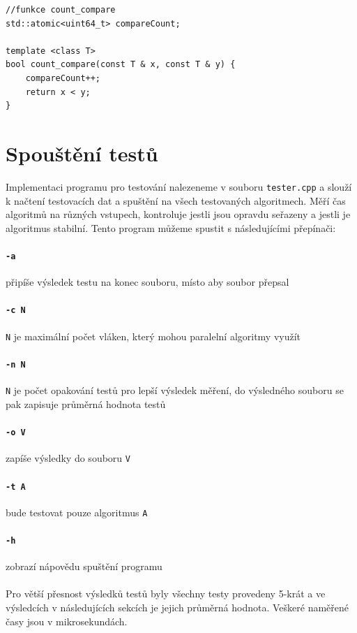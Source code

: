 \documentclass[thesis=B,czech]{FITthesis}[2019/12/23]
\begin{document}
\begin{verbatim}
//funkce count_compare
std::atomic<uint64_t> compareCount;

template <class T>
bool count_compare(const T & x, const T & y) {
    compareCount++;
    return x < y;
}
\end{verbatim}

\section{Spouštění testů}
Implementaci programu pro testování nalezeneme v souboru \texttt{tester.cpp} a slouží k načtení testovacích dat a spuštění na všech testovaných algoritmech. Měří čas algoritmů na různých vstupech, kontroluje jestli jsou opravdu seřazeny a jestli je algoritmus stabilní. 
Tento program můžeme spustit s následujícími přepínači:
\paragraph{\texttt{-a}}{připíše výsledek testu na konec souboru, místo aby soubor přepsal}
\paragraph{\texttt{-c N}}{\texttt{N} je maximální počet vláken, který mohou paralelní algoritmy využít}
\paragraph{\texttt{-n N}}{\texttt{N} je počet opakování testů pro lepší výsledek měření, do výsledného souboru se pak zapisuje průměrná hodnota testů}
\paragraph{\texttt{-o V}}{zapíše výsledky do souboru \texttt{V}}
\paragraph{\texttt{-t A}}{bude testovat pouze algoritmus \texttt{A}}
\paragraph{\texttt{-h}}{zobrazí nápovědu spuštění programu}
\\
\\
Pro větší přesnost výsledků testů byly všechny testy provedeny 5-krát a ve výsledcích v následujících sekcích je jejich průměrná hodnota. Veškeré naměřené časy jsou v mikrosekundách.
\end{document}
